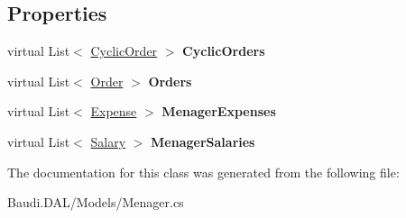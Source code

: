 \subsection*{Properties}
\begin{DoxyCompactItemize}
\item 
\hypertarget{class_baudi_1_1_d_a_l_1_1_models_1_1_menager_ab1664cce10718eed5a0975fa2009034d}{}virtual List$<$ \hyperlink{class_baudi_1_1_d_a_l_1_1_models_1_1_cyclic_order}{Cyclic\+Order} $>$ {\bfseries Cyclic\+Orders}\label{class_baudi_1_1_d_a_l_1_1_models_1_1_menager_ab1664cce10718eed5a0975fa2009034d}

\item 
\hypertarget{class_baudi_1_1_d_a_l_1_1_models_1_1_menager_a6830a13270d239c8b6d98d857169bb23}{}virtual List$<$ \hyperlink{class_baudi_1_1_d_a_l_1_1_models_1_1_order}{Order} $>$ {\bfseries Orders}\label{class_baudi_1_1_d_a_l_1_1_models_1_1_menager_a6830a13270d239c8b6d98d857169bb23}

\item 
\hypertarget{class_baudi_1_1_d_a_l_1_1_models_1_1_menager_ab744e3f0bae89bdaca920dad96279e14}{}virtual List$<$ \hyperlink{class_baudi_1_1_d_a_l_1_1_models_1_1_expense}{Expense} $>$ {\bfseries Menager\+Expenses}\label{class_baudi_1_1_d_a_l_1_1_models_1_1_menager_ab744e3f0bae89bdaca920dad96279e14}

\item 
\hypertarget{class_baudi_1_1_d_a_l_1_1_models_1_1_menager_aa91112d1211ebed97cca20287d73e88b}{}virtual List$<$ \hyperlink{class_baudi_1_1_d_a_l_1_1_models_1_1_salary}{Salary} $>$ {\bfseries Menager\+Salaries}\label{class_baudi_1_1_d_a_l_1_1_models_1_1_menager_aa91112d1211ebed97cca20287d73e88b}

\end{DoxyCompactItemize}


The documentation for this class was generated from the following file\+:\begin{DoxyCompactItemize}
\item 
Baudi.\+D\+A\+L/\+Models/Menager.\+cs\end{DoxyCompactItemize}
